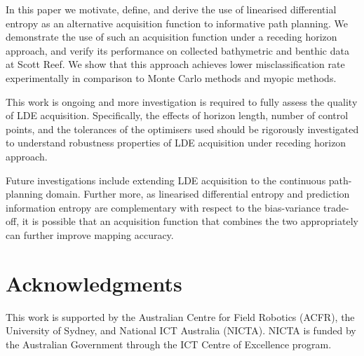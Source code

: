 \documentclass{article}
\begin{document}
	In this paper we motivate, define, and derive the use of linearised differential entropy as an alternative acquisition function to informative path planning. We demonstrate the use of such an acquisition function under a receding horizon approach, and verify its performance on collected bathymetric and benthic data at Scott Reef. We show that this approach achieves lower misclassification rate experimentally in comparison to Monte Carlo methods and myopic methods.
	
	This work is ongoing and more investigation is required to fully assess the quality of LDE acquisition. Specifically, the effects of horizon length, number of control points, and the tolerances of the optimisers used should be rigorously investigated to understand robustness properties of LDE acquisition under receding horizon approach.
	
	Future investigations include extending LDE acquisition to the continuous path-planning domain. Further more, as linearised differential entropy and prediction information entropy are complementary with respect to the bias-variance trade-off, it is possible that an acquisition function that combines the two appropriately can further improve mapping accuracy.
		
\section*{Acknowledgments}

	This work is supported by the Australian Centre for Field Robotics (ACFR), the University of Sydney, and National ICT Australia (NICTA). NICTA is funded by the Australian Government through the ICT Centre of Excellence program. 
	
%
%



\end{document}
